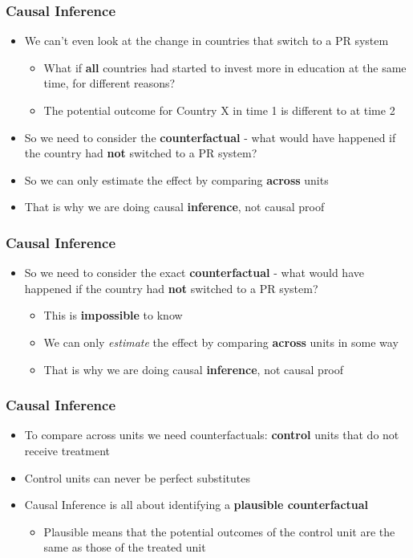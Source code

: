\documentclass[xcolor=x11names,compress]{beamer}\usepackage[]{graphicx}\usepackage[]{color}
\renewcommand{\(}{\begin{columns}}
\renewcommand{\)}{\end{columns}}
\newcommand{\<}[1]{\begin{column}{#1}}
\renewcommand{\>}{\end{column}}
\begin{document}
\begin{frame}
\frametitle{Causal Inference}
\begin{itemize}
\item We can't even look at the change in countries that switch to a PR system
\begin{itemize}
\item What if \textbf{all} countries had started to invest more in education at the same time, for different reasons?
\item The potential outcome for Country X in time 1 is different to at time 2
\end{itemize}
\item So we need to consider the \textbf{counterfactual} - what would have happened if the country had \textbf{not} switched to a PR system?
\item So we can only estimate the effect by comparing \textbf{across} units
\item That is why we are doing causal \textbf{inference}, not causal proof
\end{itemize}
\end{frame}

\begin{frame}
\frametitle{Causal Inference}
\begin{itemize}
\item So we need to consider the exact \textbf{counterfactual} - what would have happened if the country had \textbf{not} switched to a PR system?
\pause
\begin{itemize}
\item This is \textbf{impossible} to know
\pause
\item We can only \textit{estimate} the effect by comparing \textbf{across} units in some way
\pause
\item That is why we are doing causal \textbf{inference}, not causal proof
\end{itemize}
\end{itemize}
\end{frame}

\begin{frame}
\frametitle{Causal Inference}
\begin{itemize}
\item To compare across units we need counterfactuals: \textbf{control} units that do not receive treatment
\item Control units can never be perfect substitutes
\item Causal Inference is all about identifying a \textbf{plausible counterfactual}
\begin{itemize}
\item Plausible means that the potential outcomes of the control unit are the same as those of the treated unit
\end{itemize}
\end{itemize}
\end{frame}
\end{document}
